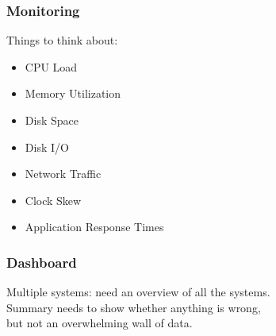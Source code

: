 \begin{frame}
\frametitle{Monitoring}
\large
\begin{changemargin}{1cm}
Things to think about:

\begin{itemize}
	\item CPU Load
	\item Memory Utilization
	\item Disk Space
	\item Disk I/O
	\item Network Traffic
	\item Clock Skew
	\item Application Response Times
\end{itemize}
\end{changemargin}

\end{frame}



\begin{frame}
\frametitle{Dashboard}

\large
\begin{changemargin}{1cm}
Multiple systems: need an overview of all the systems.\\[1em]

Summary needs to show whether anything is wrong, \\
but not an overwhelming wall of data.
\end{changemargin}
\end{frame}

{
\begin{frame}[plain]

\end{frame}
}

